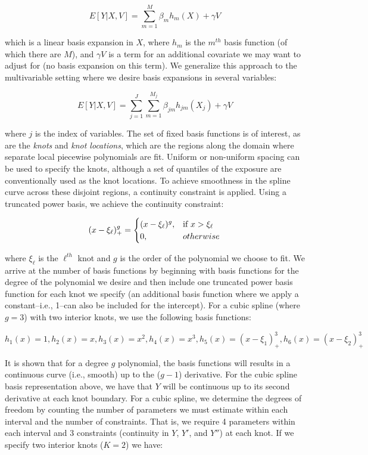 \documentclass{article}
\begin{document}
$$E[Y|X,V]=\sum_{m=1}^{M}{\beta_mh_m(X)+\gamma V}$$

\noindent which is a linear basis expansion in $X$, where $h_m$ is the $m^{th}$ basis function (of which there are $M$), and $\gamma V$ is a term for an additional covariate we may want to adjust for (no basis expansion on this term).\supercite{hastie_elements_2009} We generalize this approach to the multivariable setting where we desire basis expansions in several variables:

$$E[Y|X,V]=\sum_{j=1}^{J}\sum_{m=1}^{M_j}{\beta_{jm}{h_{jm}}(X_j)+\gamma V}$$

\noindent where $j$ is the index of variables. The set of fixed basis functions is of interest, as are the \textit{knots} and \textit{knot locations}, which are the regions along the domain where separate local piecewise polynomials are fit. Uniform or non-uniform spacing can be used to specify the knots, although a set of quantiles of the exposure are conventionally used as the knot locations. \supercite{james_introduction_2013} To achieve smoothness in the spline curve across these disjoint regions, a continuity constraint is applied. Using a truncated power basis, we achieve the continuity constraint:

\begin{equation}
(x-\xi_\ell)^{g}_{+}=\begin{cases}
(x-\xi_\ell)^{g}, & \text{if  } x > \xi_\ell \\
0, & otherwise  \notag \\
\end{cases}
\end{equation}

\noindent where $\xi_{\ell}$ is the $\ell^{th}$ knot and $g$ is the order of the polynomial we choose to fit. We arrive at the number of basis functions by beginning with basis functions for the degree of the polynomial we desire and then include one truncated power basis function for each knot we specify (an additional basis function where we apply a constant--i.e., 1--can also be included for the intercept).\supercite{james_introduction_2013} For a cubic spline (where $g=3$) with two interior knots, we use the following basis functions:

$$h_1(x)=1,h_2(x)=x, h_3(x)=x^2, h_4(x)=x^3,h_5(x)=(x-\xi_1)^{3}_{+},h_6(x)=(x-\xi_2)^{3}_{+}$$

\noindent It is shown that for a degree $g$ polynomial, the basis functions will results in a continuous curve (i.e., smooth) up to the ($g-1$) derivative. \supercite{james_introduction_2013} For the cubic spline basis representation above, we have that $Y$ will be continuous up to its second derivative at each knot boundary. For a cubic spline, we determine the degrees of freedom by counting the number of parameters we must estimate within each interval and the number of constraints. That is, we require 4 parameters within each interval and 3 constraints (continuity in $Y$, $Y'$, and $Y''$) at each knot. If we specify two interior knots ($K=2$) we have:
\end{document}
